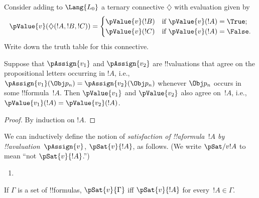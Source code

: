 \documentclass[../../../include/open-logic-section]{subfiles}
\begin{document}
\begin{prob}
Consider adding to $\Lang{L_0}$ a ternary connective $\diamondsuit$
with evaluation given by
\begin{gather*}
  \pValue{v}(\diamondsuit( !A , !B , !C ) ) = \begin{cases}
    \pValue{v}( !B ) &
    \text{if $\pValue{v}(!A) = \True$;}\\
    \pValue{v}( !C ) &
    \text{if $\pValue{v}(!A) = \False $}.
  \end{cases}
\end{gather*}
Write down the truth table for this connective.
\end{prob}

\begin{thm}
 Suppose that $\pAssign{v_1}$ and
$\pAssign{v_2}$ are !!{valuation}s that agree on the propositional
letters occurring in $!A$, i.e., $\pAssign{v_1}(\Obj p_n) =
\pAssign{v_2}(\Obj p_n)$ whenever $\Obj p_n$ occurs in some
!!{formula}~$!A$. Then $\pValue{v_1}$ and $\pValue{v_2}$ also agree
on~$!A$, i.e., $\pValue{v_1}(!A) = \pValue{v_2}(!A)$.
\end{thm}

\begin{proof}
By induction on $!A$.
\end{proof}

\begin{defn}[Satisfaction]
 We can inductively define the notion of
  \emph{satisfaction of !!a{formula}~$!A$ by
  !!a{valuation}~$\pAssign{v}$}, $\pSat{v}{!A}$, as follows.
  (We write $\pSat/{v}{!A}$ to mean ``not $\pSat{v}{!A}$.'')
\begin{enumerate}


\item {}





\end{enumerate}
If $\Gamma$ is a set of !!{formula}s, $\pSat{v}{\Gamma}$ iff
$\pSat{v}{!A}$ for every~$!A \in \Gamma$.
\end{defn}
\end{document}
